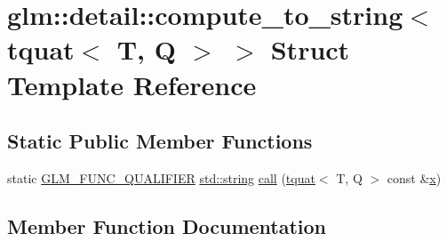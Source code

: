 \hypertarget{structglm_1_1detail_1_1compute__to__string_3_01tquat_3_01_t_00_01_q_01_4_01_4}{}\section{glm\+:\+:detail\+:\+:compute\+\_\+to\+\_\+string$<$ tquat$<$ T, Q $>$ $>$ Struct Template Reference}
\label{structglm_1_1detail_1_1compute__to__string_3_01tquat_3_01_t_00_01_q_01_4_01_4}
\subsection*{Static Public Member Functions}
\begin{DoxyCompactItemize}
\item 
static \mbox{\hyperlink{setup_8hpp_a33fdea6f91c5f834105f7415e2a64407}{G\+L\+M\+\_\+\+F\+U\+N\+C\+\_\+\+Q\+U\+A\+L\+I\+F\+I\+ER}} \mbox{\hyperlink{_s_d_l__opengl__glext_8h_ae84541b4f3d8e1ea24ec0f466a8c568b}{std\+::string}} \mbox{\hyperlink{structglm_1_1detail_1_1compute__to__string_3_01tquat_3_01_t_00_01_q_01_4_01_4_a1ba65d187491ea559fde0e390800326a}{call}} (\mbox{\hyperlink{structglm_1_1tquat}{tquat}}$<$ T, Q $>$ const \&\mbox{\hyperlink{_s_d_l__opengl_8h_ad0e63d0edcdbd3d79554076bf309fd47}{x}})
\end{DoxyCompactItemize}


\subsection{Member Function Documentation}
\mbox{\label{structglm_1_1detail_1_1compute__to__string_3_01tquat_3_01_t_00_01_q_01_4_01_4_a1ba65d187491ea559fde0e390800326a}} 
